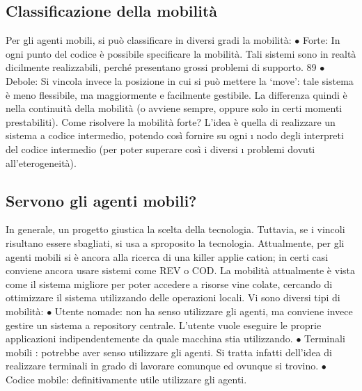 \subsection{Classificazione della mobilità}
Per gli agenti mobili, si può classificare in diversi gradi la mobilità:
$\bullet$ Forte: In ogni punto del codice è possibile specificare la mobilità. Tali
sistemi sono in realtà dicilmente realizzabili, perché presentano grossi
problemi di supporto.
89
$\bullet$ Debole: Si vincola invece la posizione in cui si può mettere la {`}move': tale
sistema è meno flessibile, ma maggiormente e facilmente gestibile.
La differenza quindi è nella continuità della mobilità (o avviene sempre, oppure
solo in certi momenti prestabiliti). Come risolvere la mobilità forte? L'idea è
quella di realizzare un sistema a codice intermedio, potendo così fornire su ogni
\i{}
nodo degli interpreti del codice intermedio (per poter superare così i diversi
\i{}
problemi dovuti all'eterogeneità).
\subsection{Servono gli agenti mobili?}
In generale, un progetto giustica la scelta della tecnologia. Tuttavia, se i vincoli
risultano essere sbagliati, si usa a sproposito la tecnologia.
Attualmente, per gli agenti mobili si è ancora alla ricerca di una killer applie
cation; in certi casi conviene ancora usare sistemi come REV o COD. La mobilità
attualmente è vista come il sistema migliore per poter accedere a risorse vine
colate, cercando di ottimizzare il sistema utilizzando delle operazioni locali. Vi
sono diversi tipi di mobilità:
$\bullet$ Utente nomade: non ha senso utilizzare gli agenti, ma conviene invece
gestire un sistema a repository centrale. L'utente vuole eseguire le proprie
applicazioni indipendentemente da quale macchina stia utilizzando.
$\bullet$ Terminali mobili : potrebbe aver senso utilizzare gli agenti. Si tratta infatti
dell'idea di realizzare terminali in grado di lavorare comunque ed ovunque
si trovino.
$\bullet$ Codice mobile: definitivamente utile utilizzare gli agenti.
